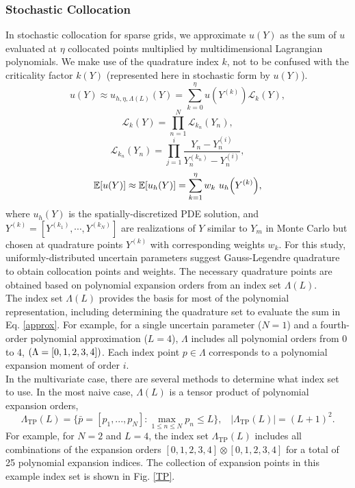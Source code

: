 \documentclass[11pt]{article}
\newcommand{\expv}[1]{\ensuremath{\mathbb{E}[ #1]}}
\begin{document}
\subsubsection{Stochastic Collocation}
In stochastic collocation for sparse grids, we approximate $u(Y)$ as the sum of $u$ evaluated at $\eta$ collocated points multiplied by multidimensional Lagrangian polynomials.  We make use of the quadrature index $k$, not to be confused with the criticality factor $k(Y)$ (represented here in stochastic form by $u(Y)$).
\begin{equation}\label{approx}
u(Y)\approx u_{h,\eta,\Lambda(L)}(Y)=\sum_{k=0}^\eta u(Y^{(k)})\mathcal{L}_k(Y),
\end{equation}
\begin{equation}
\mathcal{L}_k(Y)=\prod_{n=1}^N \mathcal{L}_{k_n}(Y_n),
\end{equation}
\begin{equation}
\mathcal{L}_{k_n}(Y_n)=\prod_{j=1}^i \frac{Y_n-Y_n^{(i)}}{Y_n^{(k_n)}-Y_n^{(i)}},
\end{equation}
\begin{equation}
\expv{u(Y)}\approx\expv{u_h(Y)}=\sum_{k=1}^\eta w_k ~u_h\qty(Y^{(k)}),
\end{equation}
where $u_h(Y)$ is the spatially-discretized PDE solution, and $Y^{(k)}=[Y^{(k_1)},\cdots,Y^{(k_N)}]$ are realizations of $Y$ similar to $Y_m$ in Monte Carlo but chosen at quadrature points $Y^{(k)}$ with corresponding weights $w_k$.  For this study, uniformly-distributed uncertain parameters suggest Gauss-Legendre quadrature to obtain collocation points and weights.  The necessary quadrature points are obtained based on polynomial expansion orders from an index set $\Lambda(L)$.  \\

The index set $\Lambda(L)$ provides the basis for most of the polynomial representation, including determining the quadrature set to evaluate the sum in Eq. \ref{approx}.  For example, for a single uncertain parameter ($N=1$) and a fourth-order polynomial approximation ($L=4$), $\Lambda$ includes all polynomial orders from 0 to 4, $\qty(\Lambda=[0,1,2,3,4])$.  Each index point $p\in\Lambda$ corresponds to a polynomial expansion moment of order $i$.\\

In the multivariate case, there are several methods to determine what index set to use.
In the most naive case, $\Lambda(L)$ is a tensor product of polynomial expansion orders,
\begin{equation}
\Lambda_\text{TP}(L)=\Big\{\bar p=[p_1,...,p_N]: \max_{1\leq n\leq N}p_n\leq L \Big\},\hspace{10pt}|\Lambda_\text{TP}(L)|=(L+1)^2.
\end{equation}
For example, for $N=2$ and $L=4$, the index set $\Lambda_\text{TP}(L)$ includes all combinations of the expansion orders $[0,1,2,3,4]\otimes[0,1,2,3,4]$ for a total of 25 polynomial expansion indices.  The collection of expansion points in this example index set is shown in Fig. \ref{TP}.  \\
\end{document}
